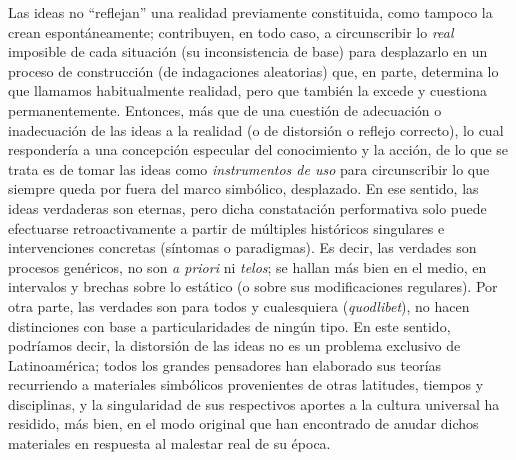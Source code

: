 Las ideas no \enquote{reflejan}  una realidad previamente constituida, como tampoco la crean espontáneamente; contribuyen, en todo caso, a circunscribir lo \emph{real} imposible de cada situación (su inconsistencia de base) para desplazarlo en un proceso de construcción (de indagaciones aleatorias) que, en parte, determina lo que llamamos habitualmente realidad, pero que también la excede y cuestiona permanentemente. Entonces, más que de una cuestión de adecuación o inadecuación de las ideas a la realidad (o de distorsión o reflejo correcto), lo cual respondería a una concepción especular del conocimiento y la acción, de lo que se trata es de tomar las ideas como \emph{instrumentos de uso} para circunscribir lo que siempre queda por fuera del marco simbólico, desplazado. En ese sentido, las ideas verdaderas son eternas, pero dicha constatación performativa solo puede efectuarse retroactivamente a partir de múltiples históricos singulares e intervenciones concretas (síntomas o paradigmas). Es decir, las verdades son procesos genéricos, no son \emph{a priori} ni \emph{telos}; se hallan más bien en el medio, en intervalos y brechas sobre lo estático (o sobre sus modificaciones regulares). Por otra parte, las verdades son para todos y cualesquiera (\emph{quodlibet}), no hacen distinciones con base a particularidades de ningún tipo. En este sentido, podríamos decir, la distorsión de las ideas no es un problema exclusivo de Latinoamérica; todos los grandes pensadores han elaborado sus teorías recurriendo a materiales simbólicos provenientes de otras latitudes, tiempos y disciplinas, y la singularidad de sus respectivos aportes a la cultura universal ha residido, más bien, en el modo original que han encontrado de anudar dichos materiales en respuesta al malestar real de su época.

